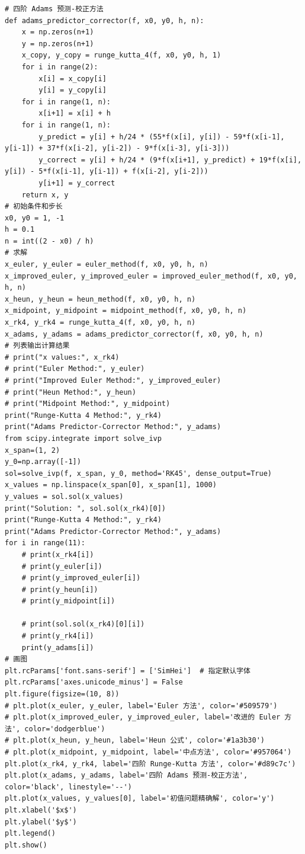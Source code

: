 \documentclass[UTF8,ctexart,a4paper,11pt,openany]{article}
\theoremstyle{definition}
\begin{document}
\begin{lstlisting}[aboveskip=0pt]
# 四阶 Adams 预测-校正方法
def adams_predictor_corrector(f, x0, y0, h, n):
    x = np.zeros(n+1)
    y = np.zeros(n+1)
    x_copy, y_copy = runge_kutta_4(f, x0, y0, h, 1)
    for i in range(2):
        x[i] = x_copy[i]
        y[i] = y_copy[i]
    for i in range(1, n):
        x[i+1] = x[i] + h
    for i in range(1, n):
        y_predict = y[i] + h/24 * (55*f(x[i], y[i]) - 59*f(x[i-1], y[i-1]) + 37*f(x[i-2], y[i-2]) - 9*f(x[i-3], y[i-3]))
        y_correct = y[i] + h/24 * (9*f(x[i+1], y_predict) + 19*f(x[i], y[i]) - 5*f(x[i-1], y[i-1]) + f(x[i-2], y[i-2]))
        y[i+1] = y_correct
    return x, y
# 初始条件和步长
x0, y0 = 1, -1
h = 0.1
n = int((2 - x0) / h)
# 求解
x_euler, y_euler = euler_method(f, x0, y0, h, n)
x_improved_euler, y_improved_euler = improved_euler_method(f, x0, y0, h, n)
x_heun, y_heun = heun_method(f, x0, y0, h, n)
x_midpoint, y_midpoint = midpoint_method(f, x0, y0, h, n)
x_rk4, y_rk4 = runge_kutta_4(f, x0, y0, h, n)
x_adams, y_adams = adams_predictor_corrector(f, x0, y0, h, n)
# 列表输出计算结果
# print("x values:", x_rk4)
# print("Euler Method:", y_euler)
# print("Improved Euler Method:", y_improved_euler)
# print("Heun Method:", y_heun)
# print("Midpoint Method:", y_midpoint)
print("Runge-Kutta 4 Method:", y_rk4)
print("Adams Predictor-Corrector Method:", y_adams)
from scipy.integrate import solve_ivp
x_span=(1, 2)
y_0=np.array([-1])
sol=solve_ivp(f, x_span, y_0, method='RK45', dense_output=True)
x_values = np.linspace(x_span[0], x_span[1], 1000)
y_values = sol.sol(x_values)
print("Solution: ", sol.sol(x_rk4)[0])
print("Runge-Kutta 4 Method:", y_rk4)
print("Adams Predictor-Corrector Method:", y_adams)
for i in range(11):
    # print(x_rk4[i])
    # print(y_euler[i])
    # print(y_improved_euler[i])
    # print(y_heun[i])
    # print(y_midpoint[i])

    # print(sol.sol(x_rk4)[0][i])
    # print(y_rk4[i])
    print(y_adams[i])
# 画图
plt.rcParams['font.sans-serif'] = ['SimHei']  # 指定默认字体
plt.rcParams['axes.unicode_minus'] = False
plt.figure(figsize=(10, 8))
# plt.plot(x_euler, y_euler, label='Euler 方法', color='#509579')
# plt.plot(x_improved_euler, y_improved_euler, label='改进的 Euler 方法', color='dodgerblue')
# plt.plot(x_heun, y_heun, label='Heun 公式', color='#1a3b30')
# plt.plot(x_midpoint, y_midpoint, label='中点方法', color='#957064')
plt.plot(x_rk4, y_rk4, label='四阶 Runge-Kutta 方法', color='#d89c7c')
plt.plot(x_adams, y_adams, label='四阶 Adams 预测-校正方法', color='black', linestyle='--')
plt.plot(x_values, y_values[0], label='初值问题精确解', color='y')
plt.xlabel('$x$')
plt.ylabel('$y$')
plt.legend()
plt.show()
    
\end{lstlisting}
\end{document}

